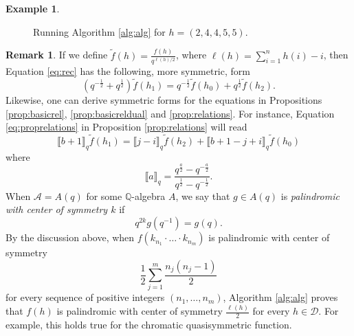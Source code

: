 \documentclass[10pt]{amsart}
\theoremstyle{definition}
\newtheorem{Exa}[Lem]{Example}
\newtheorem{Rem}[Lem]{Remark}
\newcommand{\A}{\mathcal A}
\newcommand{\D}{\mathcal{D}}
\newcommand{\dyckpath}[2]{
\draw[line width=2pt] (#1) foreach \dir in {#2}{ -- ++(\dir*90:1)};
}
\newcommand{\gline}[4]{
\draw[line width=#4 pt, color=#3] (#1) -- (#2);
}
\begin{document}
\begin{Exa}
\begin{figure}[htb]
    \caption{Running Algorithm \ref{alg:alg} for $h=(2,4,4,5,5)$.}
    \label{fig:alg}
    \end{figure}
\end{Exa}

\begin{Rem}
  If we define $\widetilde{f}(h)=\frac{f(h)}{q^{\ell(h)/2}}$, where $\ell(h)=\sum_{i=1}^n h(i)-i$, then Equation \eqref{eq:rec} has the following, more symmetric, form
  \[
  (q^{-\frac{1}{2}}+q^{\frac{1}{2}})\widetilde{f}(h_1)=q^{-\frac{1}{2}}\widetilde{f}(h_0)+q^{\frac{1}{2}}\widetilde{f}(h_2).
  \]
  Likewise, one can derive symmetric forms for the equations in Propositions \ref{prop:basicrel}, \ref{prop:basicreldual} and \ref{prop:relations}. For instance, Equation \eqref{eq:proprelations} in Proposition \eqref{prop:relations} will read
  \[
  \llbracket b+1\rrbracket_q\widetilde{f}(h_1)=\llbracket j-i\rrbracket_q\widetilde{f}(h_2)+\llbracket b+1-j+i\rrbracket_q\widetilde{f}(h_0)
  \]
  where
  \[
  \llbracket a\rrbracket_q=\frac{q^{\frac{a}{2}}-q^{-\frac{a}{2}}}{q^{\frac{1}{2}}-q^{-\frac{1}{2}}}.
  \]
  When $\A=A(q)$ for some $\mathbb{Q}$-algebra $A$, we say that $g\in A(q)$ is \emph{palindromic with center of symmetry $k$} if
  \[
  q^{2k}g(q^{-1})=g(q).
  \]
  By the discussion above,  when $f(k_{n_1}\cdot\ldots \cdot k_{n_m})$ is palindromic with center of symmetry 
  \[
  \frac{1}{2}\sum_{j=1}^m \frac{n_j(n_j-1)}{2}
  \]
  for every sequence of positive integers $(n_1,\ldots, n_m)$, Algorithm \ref{alg:alg} proves that  $f(h)$ is palindromic with center of symmetry $\frac{\ell(h)}{2}$ for every $h\in \D$. For example, this holds true for the chromatic quasisymmetric function.\par
 \end{Rem} 
  
\end{document}
